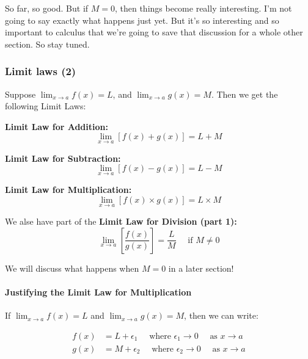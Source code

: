 \documentclass[pdftex, brazil, 12pt, twoside]{article}
\begin{document}
So far, so good.
But if $M = 0$, then things
become really interesting.
I'm not going to say exactly what happens just yet.
But it's so interesting and so important to calculus
that we're going to save that discussion
for a whole other section.
So stay tuned.

\subsubsection{Limit laws (2)}
\label{u0-intro-laws2}

Suppose $\displaystyle \lim_{x \to a}f(x) = L$, and $\displaystyle \lim_{x \to a}g(x) = M$.
Then we get the following Limit Laws:

\textbf{Limit Law for Addition:}
\begin{equation}
  \lim_{x \to a}\left[f(x) + g(x)\right] = L + M
\end{equation}

\textbf{Limit Law for Subtraction:}
\begin{equation}
  \lim_{x \to a}\left[f(x) - g(x)\right] = L - M
\end{equation}

\textbf{Limit Law for Multiplication:}
\begin{equation}
  \lim_{x \to a}\left[f(x) \times g(x)\right] = L \times M
\end{equation}

We alse have part of the \textbf{Limit Law for Division (part 1):}
\begin{equation}
  \lim_{x \to a}\left[\frac{f(x)}{g(x)}\right] = \frac{L}{M} \quad \text{ if } M \ne 0
\end{equation}

We will discuss what happens when $M=0$ in a later section!

\paragraph{Justifying the Limit Law for Multiplication} If $\displaystyle \lim_{x \to a}f(x) = L$
and $\displaystyle \lim_{x \to a}g(x) = M$, then we can write:

\begin{equation}
  \begin{split}
    f(x) &= L + \epsilon_1 \quad \text{ where } \epsilon_1 \to 0 \quad \text{ as } x \to a\\
    g(x) &= M + \epsilon_2 \quad \text{ where } \epsilon_2 \to 0 \quad \text{ as } x \to a
  \end{split}
\end{equation}
\end{document}
